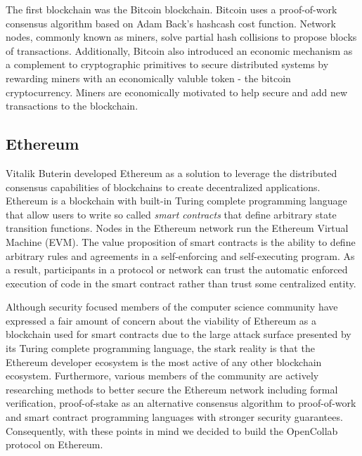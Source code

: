 The first blockchain was the Bitcoin blockchain\cite{bitcoin}. Bitcoin uses a
proof-of-work consensus algorithm based on Adam Back's hashcash cost function.
Network nodes, commonly known as miners, solve partial hash collisions to propose blocks of transactions. Additionally, Bitcoin also introduced an economic mechanism as a
complement to cryptographic primitives to secure distributed systems by
rewarding miners with an economically valuble token - the
bitcoin cryptocurrency. Miners are economically motivated to help secure and add
new transactions to the blockchain.

\subsection{Ethereum}

Vitalik Buterin developed Ethereum as a solution to leverage the distributed
consensus capabilities of blockchains to create decentralized
applications. Ethereum is a blockchain with built-in Turing
complete programming language that allow users to write so called \textit{smart
  contracts} that define arbitrary state transition functions\cite{ethereum}.
Nodes in the Ethereum network run the Ethereum Virtual Machine (EVM). The value
proposition of smart contracts is the ability to define arbitrary rules and
agreements in a self-enforcing and self-executing program. As a result,
participants in a protocol or network can trust the automatic enforced execution
of code in the smart contract rather than trust some centralized entity.

Although security focused members of the computer science community have
expressed a fair amount of concern about the viability of Ethereum as a
blockchain used for smart contracts due to the large attack surface presented by
its Turing complete programming language, the stark reality is that the Ethereum
developer ecosystem is the most active of any other blockchain ecosystem.
Furthermore, various members of the community are actively researching methods
to better secure the Ethereum network including formal verification,
proof-of-stake as an alternative consensus algorithm to proof-of-work and smart
contract programming languages with stronger security guarantees.
Consequently, with these points in mind we decided to build the OpenCollab protocol on Ethereum.

